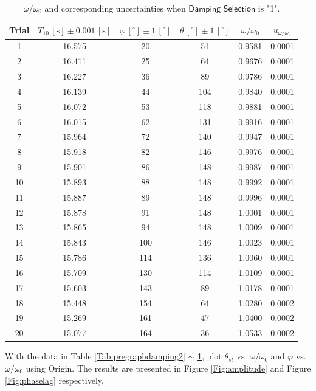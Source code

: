 \documentclass[a4paper]{article}
\begin{document}
\begin{table}[htbp]
\centering
\begin{tabular}{cccccc}
\toprule
Trial & $T_{10}\,[\text{s}]\pm0.001\,[\text{s}]$ & $\varphi\,[^\circ]\pm1\,[^\circ]$ & $\theta\,[^\circ]\pm 1\,[^\circ]$ & $\omega/\omega_0$ & $u_{\omega/\omega_0}$\\
\midrule
1&16.575	&20	&51	&0.9581 	&0.0001 \\
2&16.411	&25	&64	&0.9676 	&0.0001 \\
3&16.227	&36	&89	&0.9786 	&0.0001 \\
4&16.139	&44	&104	&0.9840 	&0.0001 \\
5&16.072	&53	&118	&0.9881 	&0.0001 \\
6&16.015	&62	&131	&0.9916 	&0.0001 \\
7&15.964	&72	&140	&0.9947 	&0.0001 \\
8&15.918	&82	&146	&0.9976 	&0.0001 \\
9&15.901	&86	&148	&0.9987 	&0.0001 \\
10&15.893	&88	&148	&0.9992 	&0.0001 \\
11&15.887	&89	&148	&0.9996 	&0.0001 \\
12&15.878	&91	&148	&1.0001 	&0.0001 \\
13&15.865	&94	&148	&1.0009 	&0.0001 \\
14&15.843	&100	&146	&1.0023 	&0.0001 \\
15&15.786	&114	&136	&1.0060 	&0.0001 \\
16&15.709	&130	&114	&1.0109 	&0.0001 \\
17&15.603	&143	&89	&1.0178 	&0.0001 \\
18&15.448	&154	&64	&1.0280 	&0.0002 \\
19&15.269	&161	&47	&1.0400 	&0.0002 \\
20&15.077	&164	&36	&1.0533 	&0.0002 \\
\bottomrule
\end{tabular}
\caption{$\omega/\omega_0$ and corresponding uncertainties when $\textsf{Damping Selection}$ is "1".\label{Tab:graphdamping1}}
\end{table}



With the data in Table \ref{Tab:pregraphdamping2} $\sim$ \ref{Tab:graphdamping1}, plot $\theta_{st}$ vs. $\omega/\omega_0$ and $\varphi$ vs. $\omega/\omega_0$ using Origin. The results are presented in Figure \ref{Fig:amplitude} and Figure \ref{Fig:phaselag} respectively.
\end{document}
